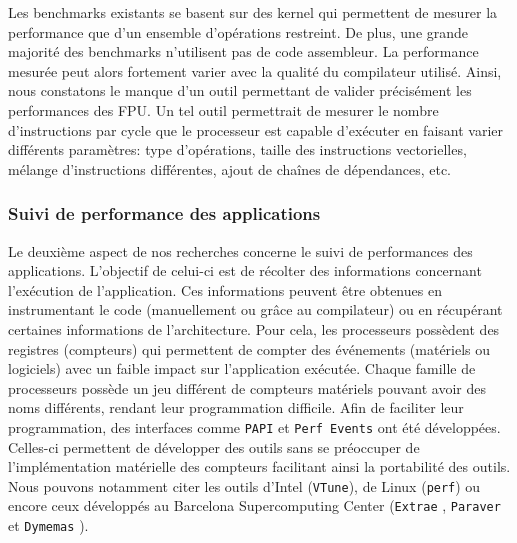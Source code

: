                 Les benchmarks existants se basent sur des \gls{kernel} qui permettent de mesurer la performance que d'un ensemble d'opérations restreint. De plus, une grande majorité des benchmarks n'utilisent pas de code assembleur. La performance mesurée peut alors fortement varier avec la qualité du compilateur utilisé. Ainsi, nous constatons le manque d'un outil permettant de valider précisément les performances des \gls{FPU}. Un tel outil permettrait de mesurer le nombre d'instructions par cycle que le processeur est capable d'exécuter en faisant varier différents paramètres: type d'opérations, taille des instructions vectorielles, mélange d'instructions différentes, ajout de chaînes de dépendances, etc.
                
                
        \subsubsection{Suivi de performance des applications}
        
            Le deuxième aspect de nos recherches concerne le suivi de performances des applications. L'objectif de celui-ci est de récolter des informations concernant l'exécution de l'application. Ces informations peuvent être obtenues en instrumentant le code (manuellement ou grâce au compilateur) ou en récupérant certaines informations de l'architecture. Pour cela, les processeurs possèdent des registres (compteurs) qui permettent de compter des événements (matériels ou logiciels) avec un faible impact sur l'application exécutée. Chaque famille de processeurs possède un jeu différent de compteurs matériels pouvant avoir des noms différents, rendant leur programmation difficile. Afin de faciliter leur programmation, des interfaces comme \verb=PAPI= \cite{Browne2000} et \verb=Perf Events= \cite{Weaver2013} ont été développées. Celles-ci permettent de développer des outils sans se préoccuper de l'implémentation matérielle des compteurs facilitant ainsi la portabilité des outils. Nous pouvons notamment citer les outils d'Intel (\verb=VTune=), de Linux (\verb=perf=) ou encore ceux développés au Barcelona Supercomputing Center (\verb=Extrae= \cite{Rodriguez}, \verb=Paraver= \cite{Pillet1995} et \verb=Dymemas= \cite{Labarta1997}).
            
